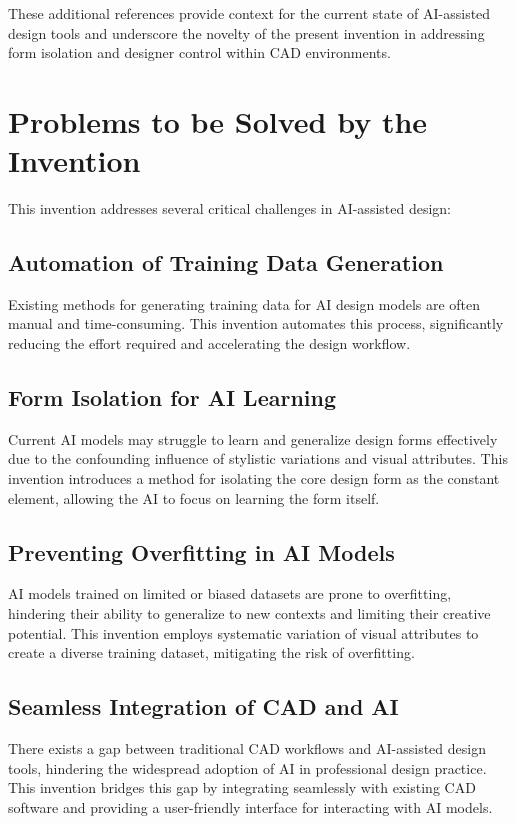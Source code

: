 \documentclass{article}
\begin{document}
These additional references provide context for the current state of AI-assisted design tools and underscore the novelty of the present invention in addressing form isolation and designer control within CAD environments.

\section{Problems to be Solved by the Invention}

This invention addresses several critical challenges in AI-assisted design:

\subsection{Automation of Training Data Generation}
Existing methods for generating training data for AI design models are often manual and time-consuming. This invention automates this process, significantly reducing the effort required and accelerating the design workflow.

\subsection{Form Isolation for AI Learning}
Current AI models may struggle to learn and generalize design forms effectively due to the confounding influence of stylistic variations and visual attributes. This invention introduces a method for isolating the core design form as the constant element, allowing the AI to focus on learning the form itself.

\subsection{Preventing Overfitting in AI Models}
AI models trained on limited or biased datasets are prone to overfitting, hindering their ability to generalize to new contexts and limiting their creative potential. This invention employs systematic variation of visual attributes to create a diverse training dataset, mitigating the risk of overfitting.

\subsection{Seamless Integration of CAD and AI}
There exists a gap between traditional CAD workflows and AI-assisted design tools, hindering the widespread adoption of AI in professional design practice. This invention bridges this gap by integrating seamlessly with existing CAD software and providing a user-friendly interface for interacting with AI models.
\end{document}
